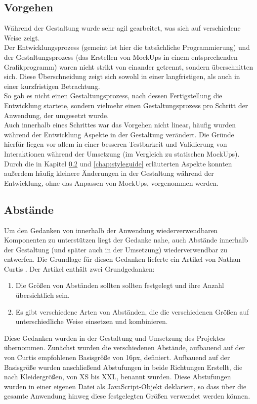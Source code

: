 \subsection{Vorgehen}
Während der Gestaltung wurde sehr agil gearbeitet, was sich auf verschiedene Weise zeigt.\\
Der Entwicklungsprozess (gemeint ist hier die tatsächliche Programmierung) und der Gestaltungsprozess (das Erstellen von MockUps in einem entsprechenden Grafikprogramm) waren nicht strikt von einander getrennt, sondern überschnitten sich. Diese Überschneidung zeigt sich sowohl in einer langfristigen, als auch in einer kurzfristigen Betrachtung.\\
So gab es nicht einen Gestaltungsprozess, nach dessen Fertigstellung die Entwicklung startete, sondern vielmehr einen Gestaltungsprozess pro Schritt der Anwendung, der umgesetzt wurde.\\
Auch innerhalb eines Schrittes war das Vorgehen nicht linear, häufig wurden während der Entwicklung Aspekte in der Gestaltung verändert. Die Gründe hierfür liegen vor allem in einer besseren Testbarkeit und Validierung von Interaktionen während der Umsetzung (im Vergleich zu statischen MockUps).\\
Durch die in Kapitel \ref{chap:spacing} und \ref{chap:styleguide} erläuterten Aspekte konnten außerdem häufig kleinere Änderungen in der Gestaltung während der Entwicklung, ohne das Anpassen von MockUps, vorgenommen werden.

\subsection{Abstände}
\label{chap:spacing}
Um den Gedanken von innerhalb der Anwendung wiederverwendbaren Komponenten zu unterstützen liegt der Gedanke nahe, auch Abstände innerhalb der Gestaltung (und später auch in der Umsetzung) wiederverwendbar zu entwerfen. Die Grundlage für diesen Gedanken lieferte ein Artikel von Nathan Curtis \cite{CurtisSpace16}. Der Artikel enthält zwei Grundgedanken:

\begin{enumerate}
  \item Die Größen von Abständen sollten sollten festgelegt und ihre Anzahl übersichtlich sein.
  \item Es gibt verschiedene Arten von Abständen, die die verschiedenen Größen auf unterschiedliche Weise einsetzen und kombinieren.
\end{enumerate}

Diese Gedanken wurden in der Gestaltung und Umsetzung des Projektes übernommen. Zunächst wurden die verschiedenen Abstände, aufbauend auf der von Curtis empfohlenen Basisgröße von 16px, definiert. Aufbauend auf der Basisgröße wurden anschließend Abstufungen in beide Richtungen
Erstellt, die nach Kleidergrößen, von XS bis XXL, benannt wurden.
Diese Abstufungen wurden in einer eigenen Datei als JavaScript-Objekt deklariert, so dass über die gesamte Anwendung hinweg diese festgelegten Größen verwendet werden können.

